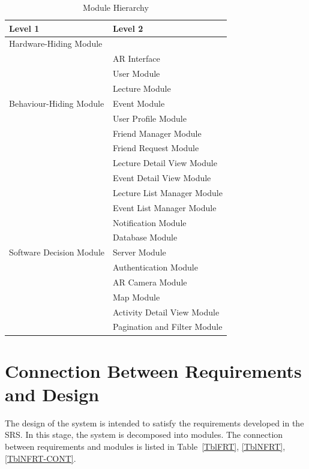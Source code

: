 \documentclass[12pt, titlepage]{article}
\begin{document}
\begin{table}[h!]
\centering
\begin{tabular}{p{} p{}}
\toprule
\textbf{Level 1} & \textbf{Level 2}\\
\midrule

{Hardware-Hiding Module} & ~ \\
\midrule

\multirow{7}{0.3\textwidth}{Behaviour-Hiding Module}
& AR Interface\\
& User Module\\
& Lecture Module\\
& Event Module\\
& User Profile Module\\
& Friend Manager Module\\ 
& Friend Request Module\\ 
& Lecture Detail View Module\\
& Event Detail View Module\\
& Lecture List Manager Module\\
& Event List Manager Module\\
& Notification Module\\
\midrule

\multirow{3}{0.3\textwidth}{Software Decision Module}
& Database Module\\
& Server Module\\
& Authentication Module\\
& AR Camera Module\\
& Map Module\\
& Activity Detail View Module\\
& Pagination and Filter Module\\
\bottomrule

\end{tabular}
\caption{Module Hierarchy}
\label{TblMH}
\end{table}

\section{Connection Between Requirements and Design} \label{SecConnection}

The design of the system is intended to satisfy the requirements developed in
the SRS. In this stage, the system is decomposed into modules. The connection
between requirements and modules is listed in Table~\ref{TblFRT}, \ref{TblNFRT}, \ref{TblNFRT-CONT}.
\end{document}
